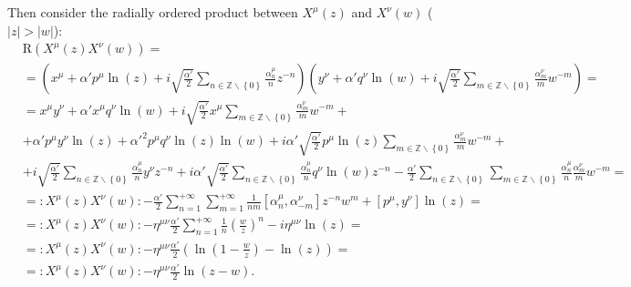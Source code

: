 \documentclass[10pt,a4paper]{article}
\begin{document}
    Then consider the radially ordered product between $X^{\mu}\left( z
    \right)$ and $X^{\nu}\left( w \right)$ ($\left| z \right| > \left| w
    \right|$):
    \begin{align*}
        &\mathrm{R}\left( X^{\mu}\left( z \right) X^{\nu}\left( w \right)
        \right) =
        \\
        &= \left( x^{\mu} + \alpha' p^{\mu} \ln\left( z \right) + i
        \sqrt{\frac{\alpha'}{2}} \sum\limits_{n \in \mathbb{Z}\backslash
        \left\lbrace 0 \right\rbrace} \frac{\alpha_n^{\mu}}{n} z^{-n} \right)
        \left( y^{\nu} + \alpha' q^{\nu} \ln\left( w \right) + i
        \sqrt{\frac{\alpha'}{2}} \sum\limits_{m \in \mathbb{Z}\backslash
        \left\lbrace 0 \right\rbrace} \frac{\alpha_m^{\nu}}{m} w^{-m} \right) =
        \\
        &= x^{\mu} y^{\nu} + \alpha' x^{\mu} q^{\nu} \ln\left( w \right) + i
        \sqrt{\frac{\alpha'}{2}} x^{\mu} \sum\limits_{m \in
        \mathbb{Z}\backslash \left\lbrace 0 \right\rbrace}
        \frac{\alpha^{\nu}_m}{m} w^{-m} +
        \\
        &+ \alpha' p^{\mu} y^{\nu} \ln\left( z \right) + \alpha'^2 p^{\mu}
        q^{\nu} \ln\left( z \right) \ln\left( w \right) + i \alpha'
        \sqrt{\frac{\alpha'}{2}} p^{\mu} \ln\left( z \right) \sum\limits_{m \in
        \mathbb{Z}\backslash \left\lbrace 0 \right\rbrace}
        \frac{\alpha^{\nu}_m}{m} w^{-m} +
        \\
        &+ i \sqrt{\frac{\alpha'}{2}} \sum\limits_{n \in \mathbb{Z}\backslash
        \left\lbrace 0 \right\rbrace} \frac{\alpha^{\mu}_n}{n} y^{\nu} z^{-n} +
        i \alpha' \sqrt{\frac{\alpha'}{2}}         \sum\limits_{n \in
        \mathbb{Z}\backslash \left\lbrace 0 \right\rbrace}
        \frac{\alpha^{\mu}_n}{n} q^{\nu} \ln\left( w \right) z^{-n} -
        \frac{\alpha'}{2} \sum\limits_{n \in \mathbb{Z}\backslash \left\lbrace
        0 \right\rbrace} \sum\limits_{m \in \mathbb{Z}\backslash \left\lbrace 0
        \right\rbrace} \frac{\alpha^{\mu}_n}{n} \frac{\alpha^{\nu}_m}{m} w^{-m}
        =
        \\
        &= \colon X^{\mu}\left( z \right) X^{\nu}\left( w \right) \colon -
        \frac{\alpha'}{2} \sum\limits_{n = 1}^{+\infty} \sum\limits_{m
        =1}^{+\infty} \frac{1}{nm} \left[ \alpha_n^{\mu}, \alpha_{-m}^{\nu}
        \right] z^{-n} w^m + \left[ p^{\mu}, y^{\nu} \right] \ln\left( z
        \right) =
        \\
        &= \colon X^{\mu}\left( z \right) X^{\nu}\left( w \right) \colon -
        \eta^{\mu\nu} \frac{\alpha'}{2} \sum\limits_{n = 1}^{+\infty}
        \frac{1}{n} \left( \frac{w}{z} \right)^n - i \eta^{\mu\nu} \ln\left( z
        \right) =
        \\
        &= \colon X^{\mu}\left( z \right) X^{\nu}\left( w \right) \colon -
        \eta^{\mu\nu} \frac{\alpha'}{2} \left( \ln\left( 1 - \frac{w}{z}
        \right) - \ln\left( z \right) \right) =
        \\
        &= \colon X^{\mu}\left( z \right) X^{\nu}\left( w \right) \colon -
        \eta^{\mu\nu} \frac{\alpha'}{2} \ln\left( z - w \right).
    \end{align*}
\end{document}
